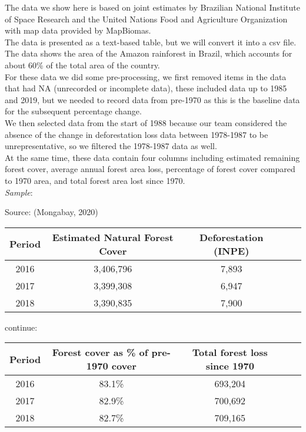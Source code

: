 \documentclass[12pt]{article}
\begin{document}
\begin{enumerate}
\begin{text}
The data we show here is based on joint estimates by Brazilian National Institute of Space Research and the United Nations Food and Agriculture Organization with map data provided by MapBiomas.\\
    The data is presented as a text-based table, but we will convert it into a csv file. The data shows the area of the Amazon rainforest in Brazil, which accounts for about 60\% of the total area of the country.\\
    For these data we did some pre-processing, we first removed items in the data that had NA (unrecorded or incomplete data), these included data up to 1985 and 2019, but we needed to record data from pre-1970 as this is the baseline data for the subsequent percentage change.\\
    We then selected data from the start of 1988 because our team considered the absence of the change in deforestation loss data between 1978-1987 to be unrepresentative, so we filtered the 1978-1987 data as well.\\
    At the same time, these data contain four columns including estimated remaining forest cover, average annual forest area loss, percentage of forest cover compared to 1970 area, and total forest area lost since 1970.\\


    \emph{Sample}:

    Source: (Mongabay, 2020)



    \begin{tabular}{ |c|c|c|c|c| }
    \hline
    Period &	Estimated Natural Forest Cover &	Deforestation (INPE) \\
      \hline
      2016 & 3,406,796  & 7,893 \\
      \hline
      2017 & 3,399,308  & 6,947  \\
      \hline
      2018 & 3,390,835  & 7,900   \\
      \hline
    \end{tabular}

    continue:

    \begin{tabular}{ |c|c|c|c|c| }
    \hline
    Period & Forest cover as \% of pre-1970 cover & Total forest loss since 1970  \\
      \hline
      2016 &  	83.1\% & 	693,204  \\
      \hline
      2017 & 82.9\% &	700,692  \\
      \hline
      2018 &  82.7\% &	709,165  \\
      \hline
    \end{tabular}
\end{text}
\newpage


\end{enumerate}
\end{document}
